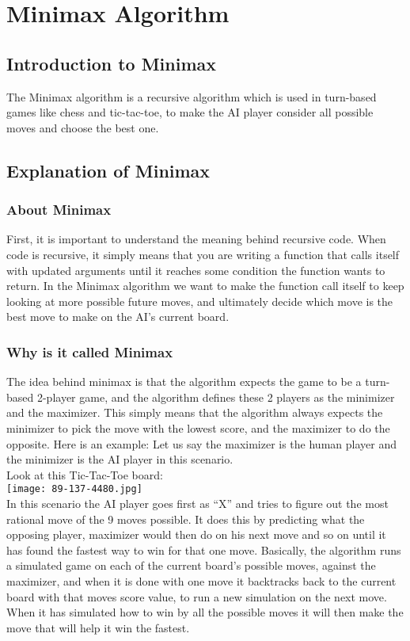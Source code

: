 \section{Minimax Algorithm} 
\label{sec:Minimax Algorithm}

\subsection{Introduction to Minimax}
\label{subsec:Introduction to Minimax}
The Minimax algorithm is a recursive algorithm which is used in turn-based games like chess and tic-tac-toe, 
to make the AI player consider all possible moves and choose the best one.

\subsection{Explanation of Minimax}
\label{subsec:Explanation of Minimax}
\subsubsection{About Minimax}
First, it is important to understand the meaning behind recursive code. 
When code is recursive, it simply means that you are writing a function that calls itself with updated arguments until it reaches some condition the function wants to return. 
In the Minimax algorithm we want to make the function call itself to keep looking at more possible future moves, 
and ultimately decide which move is the best move to make on the AI’s current board.
\subsubsection{Why is it called Minimax}
The idea behind minimax is that the algorithm expects the game to be a turn-based 2-player game, and the algorithm defines these 2 players as the minimizer and the maximizer. 
This simply means that the algorithm always expects the minimizer to pick the move with the lowest score, and the maximizer to do the opposite. 
Here is an example: Let us say the maximizer is the human player and the minimizer is the AI player in this scenario.\\

Look at this Tic-Tac-Toe board:\\
\texttt{[image: 89-137-4480.jpg]}\\
In this scenario the AI player goes first as “X” and tries to figure out the most rational move of the 9 moves possible. 
It does this by predicting what the opposing player, maximizer would then do on his next move and so on until it has found the fastest way to win for that one move. 
Basically, the algorithm runs a simulated game on each of the current board’s possible moves, against the maximizer, 
and when it is done with one move it backtracks back to the current board with that moves score value, to run a new simulation on the next move. 
When it has simulated how to win by all the possible moves it will then make the move that will help it win the fastest.\\

